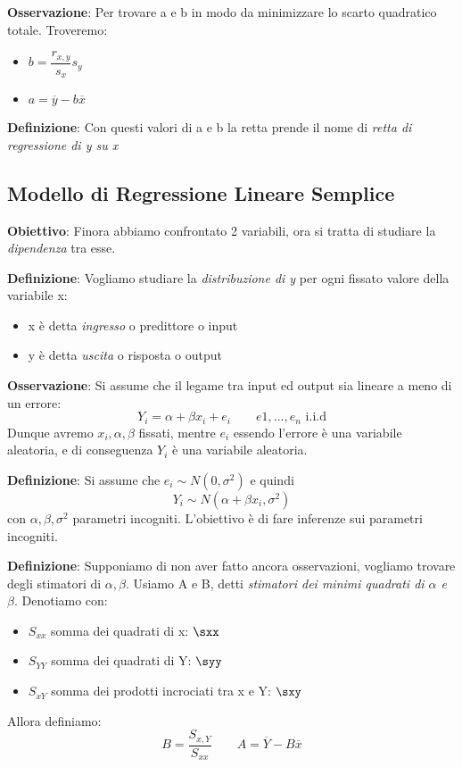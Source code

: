 \ind \textbf{Osservazione}: Per trovare a e b in modo da minimizzare lo scarto quadratico totale. Troveremo:
\begin{itemize}
    \item $b = \dfrac{r_{x,y}}{s_x} s_y$
    \item $a = \overline{y} - b\overline{x}$
\end{itemize}

\ind \textbf{Definizione}: Con questi valori di a e b la retta prende il nome di \textit{retta di regressione di y su x}

\subsection{Modello di Regressione Lineare Semplice}

\textbf{Obiettivo}: Finora abbiamo confrontato 2 variabili, ora si tratta di studiare la \textit{dipendenza} tra esse.  \n 

\ind \textbf{Definizione}: Vogliamo studiare la \textit{distribuzione di y} per ogni fissato valore della variabile x:
\begin{itemize}
    \item x è detta \textit{ingresso} o predittore o input
    \item y è detta \textit{uscita} o risposta o output
\end{itemize}

\ind \textbf{Osservazione}: Si assume che il legame tra input ed output sia lineare a meno di un errore: $$Y_i = \alpha + \beta x_i + e_i \qquad e1, ..., e_n \text{ i.i.d}$$ Dunque avremo $x_i, \alpha, \beta$ fissati, mentre $e_i$ essendo l'errore è una variabile aleatoria, e di conseguenza $Y_i$ è una variabile aleatoria. \n

\ind \textbf{Definizione}: Si assume che $e_i \sim N(0, \sigma^2)$ e quindi $$Y_i \sim N(\alpha + \beta x_i, \sigma^2)$$ con $\alpha, \beta, \sigma^2$ parametri incogniti. L'obiettivo è di fare inferenze sui parametri incogniti. \n 

\ind \textbf{Definizione}: Supponiamo di non aver fatto ancora osservazioni, vogliamo trovare degli stimatori di $\alpha, \beta$. Usiamo A e B, detti \textit{stimatori dei minimi quadrati di $\alpha$ e $\beta$}. Denotiamo con:
\begin{itemize}
    \item $S_{xx}$ somma dei quadrati di x: $\sxx$
    \item $S_{YY}$ somma dei quadrati di Y: $\syy$
    \item $S_{xY}$ somma dei prodotti incrociati tra x e Y: $\sxy$
\end{itemize} 
Allora definiamo: $$B = \dfrac{S_{x,Y}}{S_{xx}} \qquad A= \overline{Y} - B\overline{x}$$

